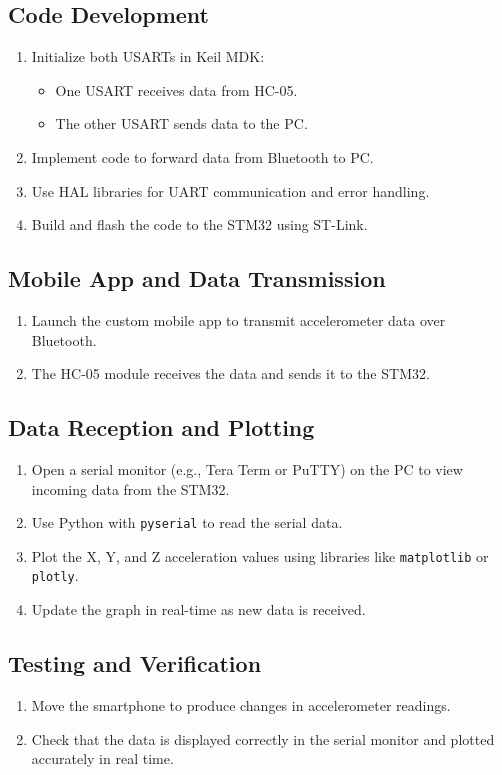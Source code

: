 \documentclass[A4paper,12pt]{extreport}
\begin{document}
\subsection{Code Development}
\begin{enumerate}
    \item Initialize both USARTs in Keil MDK:
    \begin{itemize}
        \item One USART receives data from HC-05.
        \item The other USART sends data to the PC.
    \end{itemize}
    \item Implement code to forward data from Bluetooth to PC.
    \item Use HAL libraries for UART communication and error handling.
    \item Build and flash the code to the STM32 using ST-Link.
\end{enumerate}

\subsection{Mobile App and Data Transmission}
\begin{enumerate}
    \item Launch the custom mobile app to transmit accelerometer data over Bluetooth.
    \item The HC-05 module receives the data and sends it to the STM32.
\end{enumerate}

\subsection{Data Reception and Plotting}
\begin{enumerate}
    \item Open a serial monitor (e.g., Tera Term or PuTTY) on the PC to view incoming data from the STM32.
    \item Use Python with \texttt{pyserial} to read the serial data.
    \item Plot the X, Y, and Z acceleration values using libraries like \texttt{matplotlib} or \texttt{plotly}.
    \item Update the graph in real-time as new data is received.
\end{enumerate}

\subsection{Testing and Verification}
\begin{enumerate}
    \item Move the smartphone to produce changes in accelerometer readings.
    \item Check that the data is displayed correctly in the serial monitor and plotted accurately in real time.
\end{enumerate}
\end{document}
